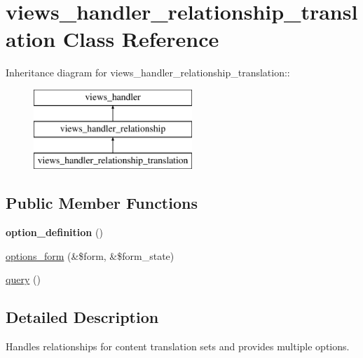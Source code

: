 \hypertarget{classviews__handler__relationship__translation}{
\section{views\_\-handler\_\-relationship\_\-translation Class Reference}
\label{classviews__handler__relationship__translation}
}
Inheritance diagram for views\_\-handler\_\-relationship\_\-translation::\begin{figure}[H]
\begin{center}
\leavevmode
\includegraphics[height=3cm]{classviews__handler__relationship__translation}
\end{center}
\end{figure}
\subsection*{Public Member Functions}
\begin{DoxyCompactItemize}
\item 
\hypertarget{classviews__handler__relationship__translation_a0bf8fe73b167b63fd5ac38bd5e8b1efe}{
{\bfseries option\_\-definition} ()}
\label{classviews__handler__relationship__translation_a0bf8fe73b167b63fd5ac38bd5e8b1efe}

\item 
\hyperlink{classviews__handler__relationship__translation_aca4668f3619b0fc6182e12cbaf38b633}{options\_\-form} (\&\$form, \&\$form\_\-state)
\item 
\hyperlink{classviews__handler__relationship__translation_af1e8ba159a9b04199ff03cad304ca1e4}{query} ()
\end{DoxyCompactItemize}


\subsection{Detailed Description}
Handles relationships for content translation sets and provides multiple options. 

